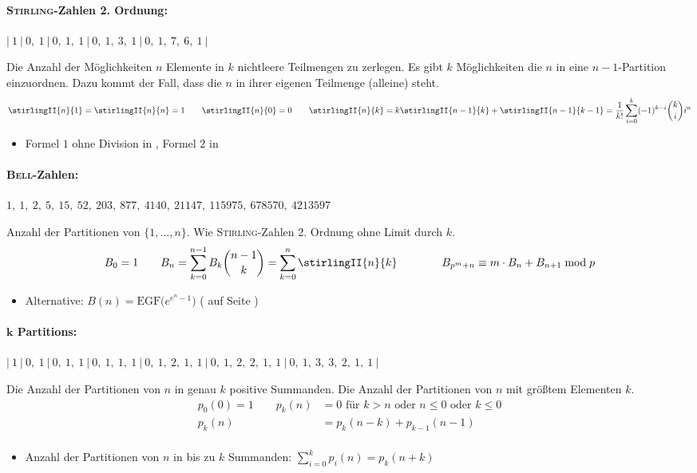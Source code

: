 \paragraph{\textsc{Stirling}-Zahlen 2. Ordnung:}
$|~1~|~0,~1~|~0,~1,~1~|~0,~1,~3,~1~|~0,~1,~7,~6,~1~|$

Die Anzahl der Möglichkeiten $n$ Elemente in $k$ nichtleere Teilmengen zu zerlegen.
Es gibt $k$ Möglichkeiten die $n$ in eine $n-1$-Partition einzuordnen.
Dazu kommt der Fall, dass die $n$ in ihrer eigenen Teilmenge (alleine) steht.
\[\stirlingII{n}{1} = \stirlingII{n}{n} = 1 \qquad
\stirlingII{n}{0} = 0 \qquad
\stirlingII{n}{k} = k \stirlingII{n-1}{k} + \stirlingII{n-1}{k-1} =
\frac{1}{k!} \sum\limits_{i=0}^{k} (-1)^{k-i}\binom{k}{i}i^n\]
\begin{itemize}
	\item Formel $1$ ohne Division in , Formel $2$ in 
\end{itemize}

\paragraph{\textsc{Bell}-Zahlen:}
$1,~1,~2,~5,~15,~52,~203,~877,~4140,~21147,~115975,~678570,~4213597$

Anzahl der Partitionen von $\{1, \ldots, n\}$.
Wie \textsc{Stirling}-Zahlen 2. Ordnung ohne Limit durch $k$.
\vspace{-0.2cm}%
\[B_0 = 1 \qquad
B_n = \sum\limits_{k = 0}^{n - 1} B_k\binom{n-1}{k}
= \sum\limits_{k = 0}^{n}\stirlingII{n}{k}\qquad\qquad B_{p^m+n}\equiv m\cdot B_n + B_{n+1} \bmod{p}\]
\begin{itemize}
	\item Alternative: $B(n) = \mathrm{EGF}\big(e^{e^n-1}\big)$ ( auf Seite \pageref{code:math/transforms/seriesOperations.cpp})
\end{itemize}

\paragraph{$\boldsymbol{k}$ Partitions:}
$|~1~|~0,~1~|~0,~1,~1~|~0,~1,~1,~1~|~0,~1,~2,~1,~1~|~0,~1,~2,~2,~1,~1~|~0,~1,~3,~3,~2,~1,~1~|$

Die Anzahl der Partitionen von $n$ in genau $k$ positive Summanden.
Die Anzahl der Partitionen von $n$ mit größtem Elementen $k$.
\begin{align*}
	p_0(0)=1 \qquad p_k(n)&=0 \text{ für } k > n \text{ oder } n \leq 0 \text{ oder } k \leq 0\\[-2pt]
	p_k(n)&= p_k(n-k) + p_{k-1}(n-1)\\[-0.55cm]
\end{align*}
\begin{itemize}
	\item Anzahl der Partitionen von $n$ in bis zu $k$ Summanden: $\sum\limits_{i=0}^{k}p_i(n)=p_k(n+k)$
\end{itemize}

